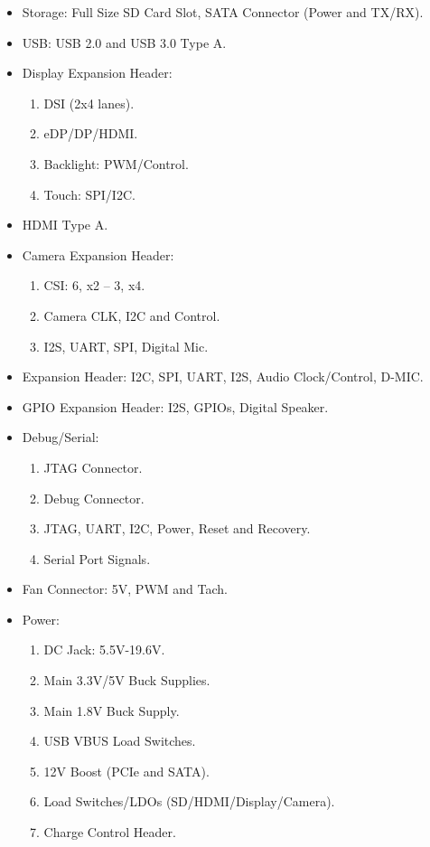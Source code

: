 \begin{itemize}
    \item Storage: Full Size SD Card Slot, SATA Connector (Power and TX/RX). 
    \item USB: USB 2.0 and USB 3.0 Type A.
    \item Display Expansion Header:
        \begin{enumerate}
            \item DSI (2x4 lanes).
            \item eDP/DP/HDMI.
            \item Backlight: PWM/Control.
            \item Touch: SPI/I2C.
        \end{enumerate}
    \item HDMI Type A. 
    \item Camera Expansion Header:
        \begin{enumerate}
            \item CSI: 6, x2 – 3, x4.
            \item Camera CLK, I2C and Control. 
            \item I2S, UART, SPI, Digital Mic.
        \end{enumerate}
    \item Expansion Header: I2C, SPI, UART, I2S, Audio Clock/Control, D-MIC.
    \item GPIO Expansion Header: I2S, GPIOs, Digital Speaker.
    \item Debug/Serial:
        \begin{enumerate}
            \item  JTAG Connector.
            \item  Debug Connector.
            \item  JTAG, UART, I2C, Power, Reset and Recovery.
            \item Serial Port Signals.
        \end{enumerate}
    \item Fan Connector: 5V, PWM and Tach.
    \item Power:
    \begin{enumerate}
            \item DC Jack: 5.5V-19.6V.
            \item Main 3.3V/5V Buck Supplies.
            \item Main 1.8V Buck Supply.
            \item USB VBUS Load Switches.
            \item  12V Boost (PCIe and SATA).
            \item Load Switches/LDOs (SD/HDMI/Display/Camera).
            \item Charge Control Header.
        \end{enumerate}
\end{itemize}

